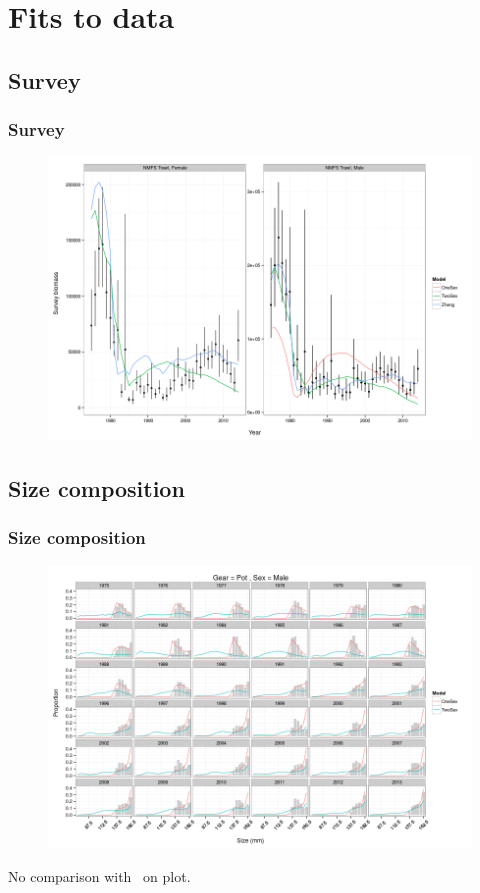 \documentclass{beamer}
\begin{document}
\section{Fits to data}


\subsection{Survey}
\begin{frame}
\frametitle{Survey}
\begin{figure}[!htbp]
  \centering
  \includegraphics[width=0.6\linewidth]{figure/survey_biomass-1.png}
\end{figure}
\end{frame}


\subsection{Size composition}
\begin{frame}
\frametitle{Size composition}
\begin{figure}[!htbp]
  \centering
  \includegraphics[width=0.6\linewidth]{figure/sc_pot_m-1.png}
\end{figure}
No comparison with~\citet{zheng_bristol_2015} on plot.
\end{frame}
\end{document}
